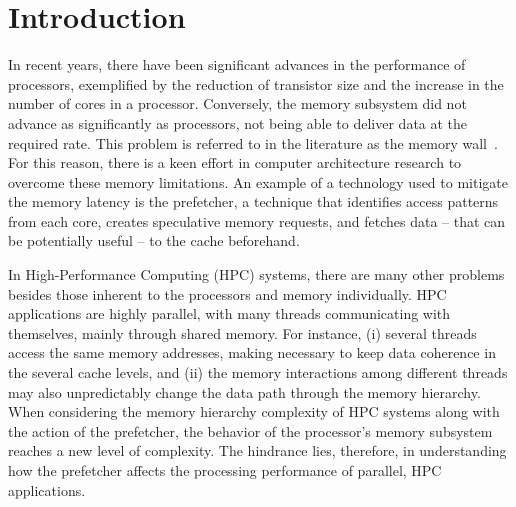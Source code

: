 \documentclass[AMA,final,STIX1COL]{WileyNJD-v2}
\newcommand{\fbm}[1]{\textcolor{red}{\bfseries \ul{fbm: #1} }\vspace{0.2cm}}
\begin{document}


\maketitle

\section{Introduction}\label{sec:introduction}

In recent years, there have been significant advances in the performance of processors, exemplified by the reduction of transistor size and the increase in the number of cores in a processor. %
Conversely, the memory subsystem did not advance as significantly as processors, not being able to deliver data at the required rate. 
This problem is referred to in the literature as the memory wall~\cite{wulf1995memory}.
For this reason, there is a keen effort in computer architecture research to overcome these memory limitations. 
An example of a technology used to mitigate the memory latency is the prefetcher, a technique that identifies access patterns from each core, creates speculative memory requests, and fetches data -- that can be potentially useful -- to the cache beforehand.

In High-Performance Computing (HPC) systems, there are many other problems besides those inherent to the processors and memory individually. 
HPC applications are highly parallel, with many threads communicating with themselves, mainly through shared memory. For instance, (i) several threads access the same memory addresses, making necessary to keep data coherence in the several cache levels, and (ii) the memory interactions among different threads may also unpredictably change the data path through the memory hierarchy. 
When considering the memory hierarchy complexity of HPC systems along with the action of the prefetcher, the behavior of the processor's memory subsystem reaches a new level of complexity. 
The hindrance lies, therefore, in understanding how the prefetcher affects the processing performance of parallel, HPC applications.
\end{document}
